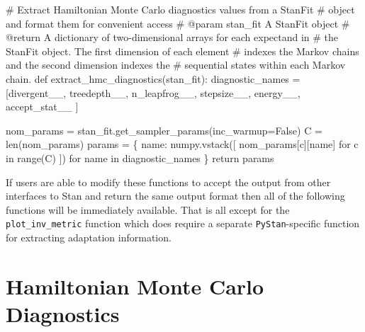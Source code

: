 \documentclass[
  letterpaper,
  DIV=11,
  numbers=noendperiod]{scrartcl}
\newenvironment{Shaded}{\begin{snugshade}}{\end{snugshade}}
\newcommand{\BuiltInTok}[1]{\textcolor[rgb]{0.00,0.23,0.31}{#1}}
\newcommand{\CommentTok}[1]{\textcolor[rgb]{0.37,0.37,0.37}{#1}}
\newcommand{\ControlFlowTok}[1]{\textcolor[rgb]{0.00,0.23,0.31}{#1}}
\newcommand{\KeywordTok}[1]{\textcolor[rgb]{0.00,0.23,0.31}{#1}}
\newcommand{\NormalTok}[1]{\textcolor[rgb]{0.00,0.23,0.31}{#1}}
\newcommand{\OperatorTok}[1]{\textcolor[rgb]{0.37,0.37,0.37}{#1}}
\newcommand{\StringTok}[1]{\textcolor[rgb]{0.13,0.47,0.30}{#1}}
\newcommand{\VariableTok}[1]{\textcolor[rgb]{0.07,0.07,0.07}{#1}}
\begin{document}
\begin{Shaded}
\begin{Highlighting}[]
\CommentTok{\# Extract Hamiltonian Monte Carlo diagnostics values from a StanFit}
\CommentTok{\# object and format them for convenient access}
\CommentTok{\# @param stan\_fit A StanFit object}
\CommentTok{\# @return A dictionary of two{-}dimensional arrays for each expectand in }
\CommentTok{\#         the StanFit object.  The first dimension of each element }
\CommentTok{\#         indexes the Markov chains and the second dimension indexes the }
\CommentTok{\#         sequential states within each Markov chain. }
\KeywordTok{def}\NormalTok{ extract\_hmc\_diagnostics(stan\_fit):}
\NormalTok{  diagnostic\_names }\OperatorTok{=}\NormalTok{ [}\StringTok{\textquotesingle{}divergent\_\_\textquotesingle{}}\NormalTok{, }\StringTok{\textquotesingle{}treedepth\_\_\textquotesingle{}}\NormalTok{, }\StringTok{\textquotesingle{}n\_leapfrog\_\_\textquotesingle{}}\NormalTok{, }
                      \StringTok{\textquotesingle{}stepsize\_\_\textquotesingle{}}\NormalTok{, }\StringTok{\textquotesingle{}energy\_\_\textquotesingle{}}\NormalTok{, }\StringTok{\textquotesingle{}accept\_stat\_\_\textquotesingle{}}\NormalTok{ ]}
  
\NormalTok{  nom\_params }\OperatorTok{=}\NormalTok{ stan\_fit.get\_sampler\_params(inc\_warmup}\OperatorTok{=}\VariableTok{False}\NormalTok{)}
\NormalTok{  C }\OperatorTok{=} \BuiltInTok{len}\NormalTok{(nom\_params)}
\NormalTok{  params }\OperatorTok{=}\NormalTok{ \{ name: numpy.vstack([ nom\_params[c][name] }
                                  \ControlFlowTok{for}\NormalTok{ c }\KeywordTok{in} \BuiltInTok{range}\NormalTok{(C) ])}
           \ControlFlowTok{for}\NormalTok{ name }\KeywordTok{in}\NormalTok{ diagnostic\_names \}}
  \ControlFlowTok{return}\NormalTok{ params}
\end{Highlighting}
\end{Shaded}

If users are able to modify these functions to accept the output from
other interfaces to Stan and return the same output format then all of
the following functions will be immediately available. That is all
except for the \texttt{plot\_inv\_metric} function which does require a
separate \texttt{PyStan}-specific function for extracting adaptation
information.

\section{Hamiltonian Monte Carlo
Diagnostics}\label{hamiltonian-monte-carlo-diagnostics}
\end{document}
